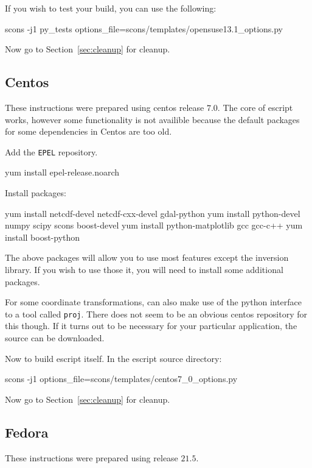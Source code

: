 \noindent If you wish to test your build, you can use the following:
\begin{shellCode}
scons -j1 py_tests options_file=scons/templates/opensuse13.1_options.py 
\end{shellCode}

\noindent Now go to Section~\ref{sec:cleanup} for cleanup.

\subsection{Centos}\label{sec:centossrc}
These instructions were prepared using centos release $7.0$.
The core of escript works, however some functionality is not availible because the default packages for some dependencies in Centos are too old.

\noindent Add the \texttt{EPEL} repository.
\begin{shellCode}
yum install epel-release.noarch
\end{shellCode}

\noindent Install packages:
\begin{shellCode}
yum install netcdf-devel netcdf-cxx-devel gdal-python
yum install python-devel numpy scipy scons boost-devel
yum install python-matplotlib gcc gcc-c++
yum install boost-python 
\end{shellCode}

The above packages will allow you to use most features except 
the \downunder inversion library.
If you wish to use those it, you will need to install some additional packages.

\noindent For some coordinate transformations, \downunder can also make use of the python interface to a tool called \texttt{proj}.
There does not seem to be an obvious centos repository for this though.
If it turns out to be necessary for your particular application, the source can be downloaded. 

\noindent Now to build escript itself.
In the escript source directory:
\begin{shellCode}
scons -j1 options_file=scons/templates/centos7_0_options.py
\end{shellCode}

\noindent Now go to Section~\ref{sec:cleanup} for cleanup.

\subsection{Fedora}\label{sec:fedorasrc}
These instructions were prepared using release $21.5$.

